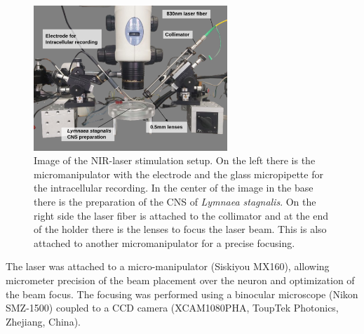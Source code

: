 \begin{figure}[htb!]
	\centering
	\includegraphics[width=0.65\textwidth]{img/methods/laser-setup_labels.png}
	\caption{Image of the NIR-laser stimulation setup. On the left there is the micromanipulator with the electrode and the glass micropipette for the intracellular recording. In the center of the image in the base there is the preparation of the CNS of \textit{Lymnaea stagnalis}. On the right side the laser fiber is attached to the collimator and at the end of the holder there is the lenses to focus the laser beam. This is also attached to another micromanipulator for a precise focusing.}
	\label{fig:laser setup}
\end{figure}

The laser was attached to a micro-manipulator (Siskiyou MX160), allowing micrometer precision of the beam placement over the neuron and optimization of the beam focus. The focusing was performed using a binocular microscope (Nikon SMZ-1500) coupled to a CCD camera (XCAM1080PHA, ToupTek Photonics, Zhejiang, China).
